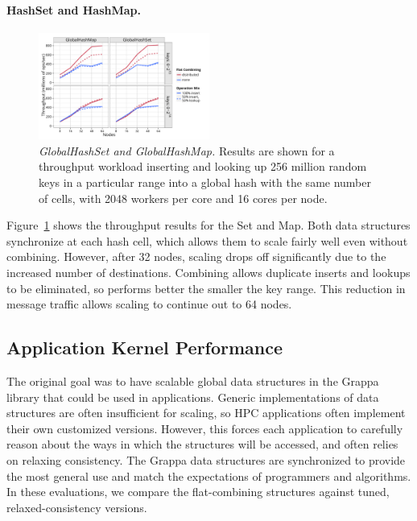 \paragraph{HashSet and HashMap.}
\begin{figure}[t]
  \centering
  \includegraphics[width=0.5\textwidth]{data/plots/hash_perf.pdf}
  \caption{\emph{GlobalHashSet and GlobalHashMap.}
    Results are shown for a throughput workload inserting and looking up 256 million random keys in a particular range into a global hash with the same number of cells, with 2048 workers per core and 16 cores per node.
  }
  \label{fig:hash_perf}
\end{figure}

Figure~\ref{fig:hash_perf} shows the throughput results for the Set and Map.
Both data structures synchronize at each hash cell, which allows them to scale fairly well even without combining. However, after 32 nodes, scaling drops off significantly due to the increased number of destinations.
Combining allows duplicate inserts and lookups to be eliminated, so performs better the smaller the key range. This reduction in message traffic allows scaling to continue out to 64 nodes.

\subsection{Application Kernel Performance}
The original goal was to have scalable global data structures in the Grappa library that could be used in applications. Generic implementations of data structures are often insufficient for scaling, so HPC applications often implement their own customized versions. However, this forces each application to carefully reason about the ways in which the structures will be accessed, and often relies on relaxing consistency.
The Grappa data structures are synchronized to provide the most general use and match the expectations of programmers and algorithms.
In these evaluations, we compare the flat-combining structures against tuned, relaxed-consistency versions.

